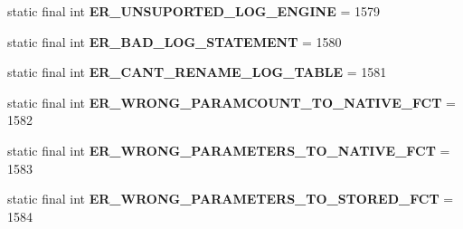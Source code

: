 \begin{DoxyCompactItemize}
\item 
\mbox{\label{classcom_1_1mysql_1_1cj_1_1exceptions_1_1_mysql_error_numbers_a6ea0c5db629ecb749c12d6d3555ef739}} 
static final int {\bfseries E\+R\+\_\+\+U\+N\+S\+U\+P\+O\+R\+T\+E\+D\+\_\+\+L\+O\+G\+\_\+\+E\+N\+G\+I\+NE} = 1579
\item 
\mbox{\label{classcom_1_1mysql_1_1cj_1_1exceptions_1_1_mysql_error_numbers_a799a85f96dea8cdd393e16af4232030c}} 
static final int {\bfseries E\+R\+\_\+\+B\+A\+D\+\_\+\+L\+O\+G\+\_\+\+S\+T\+A\+T\+E\+M\+E\+NT} = 1580
\item 
\mbox{\label{classcom_1_1mysql_1_1cj_1_1exceptions_1_1_mysql_error_numbers_a266dc09452a64ce4861b6ac63ba8589b}} 
static final int {\bfseries E\+R\+\_\+\+C\+A\+N\+T\+\_\+\+R\+E\+N\+A\+M\+E\+\_\+\+L\+O\+G\+\_\+\+T\+A\+B\+LE} = 1581
\item 
\mbox{\label{classcom_1_1mysql_1_1cj_1_1exceptions_1_1_mysql_error_numbers_a473d2b0760a6efab22d777ca2e37d347}} 
static final int {\bfseries E\+R\+\_\+\+W\+R\+O\+N\+G\+\_\+\+P\+A\+R\+A\+M\+C\+O\+U\+N\+T\+\_\+\+T\+O\+\_\+\+N\+A\+T\+I\+V\+E\+\_\+\+F\+CT} = 1582
\item 
\mbox{\label{classcom_1_1mysql_1_1cj_1_1exceptions_1_1_mysql_error_numbers_a98ce996c0af5fc1bdfe99c95a6887bf7}} 
static final int {\bfseries E\+R\+\_\+\+W\+R\+O\+N\+G\+\_\+\+P\+A\+R\+A\+M\+E\+T\+E\+R\+S\+\_\+\+T\+O\+\_\+\+N\+A\+T\+I\+V\+E\+\_\+\+F\+CT} = 1583
\item 
\mbox{\label{classcom_1_1mysql_1_1cj_1_1exceptions_1_1_mysql_error_numbers_ac90b58aff335770c4043d690102bc174}} 
static final int {\bfseries E\+R\+\_\+\+W\+R\+O\+N\+G\+\_\+\+P\+A\+R\+A\+M\+E\+T\+E\+R\+S\+\_\+\+T\+O\+\_\+\+S\+T\+O\+R\+E\+D\+\_\+\+F\+CT} = 1584
\item 
\mbox{\label{classcom_1_1mysql_1_1cj_1_1exceptions_1_1_mysql_error_numbers_a33a0395edaaefacd2ccff68a93bba539}} 

\end{DoxyCompactItemize}

